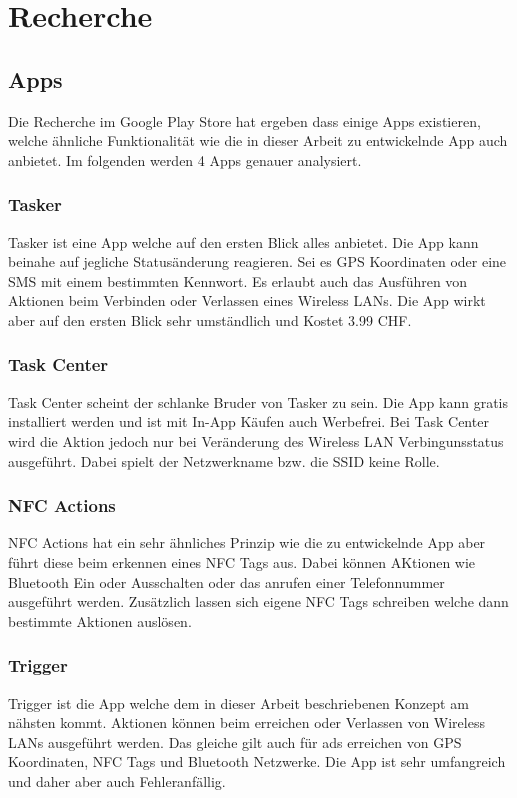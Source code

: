 \chapter{Recherche}
\label{sec:recherche}

\section{Apps}
Die Recherche im Google Play Store hat ergeben dass einige Apps existieren, welche ähnliche Funktionalität wie die in dieser Arbeit zu entwickelnde App auch anbietet. Im folgenden werden 4 Apps genauer analysiert.

\subsection{Tasker}
Tasker\citep{google.play.tasker} ist eine App welche auf den ersten Blick alles anbietet. Die App kann beinahe auf jegliche Statusänderung reagieren. Sei es GPS Koordinaten oder eine SMS mit einem bestimmten Kennwort. Es erlaubt auch das Ausführen von Aktionen beim Verbinden oder Verlassen eines Wireless LANs. Die App wirkt aber auf den ersten Blick sehr umständlich und Kostet 3.99 CHF.

\subsection{Task Center}
Task Center\citep{google.play.taskcenter} scheint der schlanke Bruder von Tasker zu sein. Die App kann gratis installiert werden und ist mit In-App Käufen auch Werbefrei. Bei Task Center wird die Aktion jedoch nur bei Veränderung des Wireless LAN Verbingunsstatus ausgeführt. Dabei spielt der Netzwerkname bzw. die SSID keine Rolle.

\subsection{NFC Actions}
NFC Actions\citep{google.play.nfcactions} hat ein sehr ähnliches Prinzip wie die zu entwickelnde App aber führt diese beim erkennen eines NFC Tags aus. Dabei können AKtionen wie Bluetooth Ein oder Ausschalten oder das anrufen einer Telefonnummer ausgeführt werden. Zusätzlich lassen sich eigene NFC Tags schreiben welche dann bestimmte Aktionen auslösen.

\subsection{Trigger}
Trigger\citep{google.play.trigger} ist die App welche dem in dieser Arbeit beschriebenen Konzept am nähsten kommt. Aktionen können beim erreichen oder Verlassen von Wireless LANs ausgeführt werden. Das gleiche gilt auch für ads erreichen von GPS Koordinaten, NFC Tags und Bluetooth Netzwerke. Die App ist sehr umfangreich und daher aber auch Fehleranfällig.

